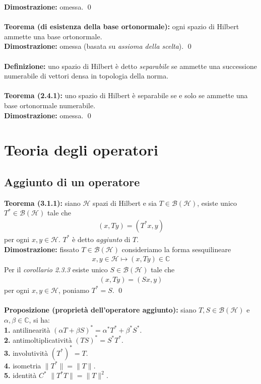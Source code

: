 \documentclass{article}
\numberwithin{equation}{subsection}
\begin{document}
\textbf{Dimostrazione:} omessa. \qed \\ \\
\textbf{Teorema (di esistenza della base ortonormale):} ogni spazio di Hilbert ammette una base ortonormale. \\

\textbf{Dimostrazione:} omessa (basata su \textit{assioma della scelta}). \qed \\ \\
\textbf{Definizione:} uno spazio di Hilbert è detto \textit{separabile} se ammette una successione numerabile di vettori densa in topologia della norma. \\ \\
\textbf{Teorema (2.4.1):} uno spazio di Hilbert è separabile se e solo se ammette una base ortonormale numerabile. \\

\textbf{Dimostrazione:} omessa. \qed

\newpage
\section{Teoria degli operatori}
\subsection{Aggiunto di un operatore}
\textbf{Teorema (3.1.1):} siano $\mathcal{H}$ spazi di Hilbert e sia $T \in \mathcal{B}(\mathcal{H})$, esiste unico $T^* \in \mathcal{B}(\mathcal{H})$ tale che 
\begin{align*}
    (x, Ty) = (T^*x, y) 
\end{align*}
per ogni $x, y \in \mathcal{H}$. $T^*$ è detto \textit{aggiunto} di $T$. \\

\textbf{Dimostrazione:} fissato $T \in \mathcal{B}(\mathcal{H})$ consideriamo la forma sesquilineare
\begin{align*}
    x, y \in \mathcal{H} \mapsto (x, Ty) \in \mathbb{C} 
\end{align*}
Per il \textit{corollario 2.3.3} esiste unico $S \in \mathcal{B}(\mathcal{H})$ tale che 
\begin{align*}
    (x, Ty) = (Sx, y) 
\end{align*}
per ogni $x, y \in \mathcal{H}$, poniamo $T^* = S$. \qed \\ \\
\textbf{Proposizione (proprietà dell'operatore aggiunto):} siano $T, S \in \mathcal{B}(\mathcal{H})$ e $\alpha, \beta \in \mathbb{C}$, si ha: \\
\textbf{1.} antilinearità $(\alpha T + \beta S)^* = \alpha^*T^* + \beta^*S^*$. \\
\textbf{2.} antimoltiplicatività $(TS)^* = S^*T^*$. \\
\textbf{3.} involutività $(T^*)^* = T$. \\
\textbf{4.} isometria $\|T^*\| = \|T\|$. \\
\textbf{5.} identità $C^*$ $\|T^*T\| = \|T\|^2$. \\
\end{document}
